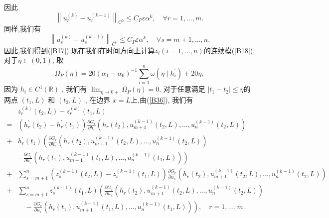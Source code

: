 \documentclass[notitlepage,cs4size,punct,oneside]{ctexrep}
\numberwithin{equation}{chapter}
\theoremstyle{mystyle}
\begin{document}
因此
\begin{equation} \label{B59}
    \left\|u_{r}^{(k)}-u_{r}^{(k-1)}\right\|_{C^{0}} \leq C_{P} \varepsilon \alpha^{k}, \quad \forall r=1, \ldots, m .
\end{equation}
同样,我们有
\begin{equation} \label{B60}
    \left\|u_{s}^{(k)}-u_{s}^{(k-1)}\right\|_{C^{0}} \leq C_{P} \varepsilon \alpha^{k}, \quad \forall s=m+1, \ldots, n .
\end{equation}
因此,我们得到(\ref{B17}).现在我们在时间方向上计算$z_{i}(i=1, \ldots, n)$的连续模(\ref{B18}),对于$\eta \in(0,1)$, 取
\begin{equation} \label{B61}
    \Omega_{P}(\eta)=20\left(\alpha_{1}-\alpha_{0}\right)^{-1} \sum_{i=1}^{n} \omega\left(\eta \mid h_{i}^{\prime}\right)+20 \eta,
\end{equation}
因为 $h_{i} \in C^{1}(\mathbb{R})$ , 我们有 $\lim_{\eta \rightarrow 0+} \Omega_{P}(\eta)=0$.
对于任意满足 $\left|t_{1}-t_{2}\right| \leq \eta$的两点 $\left(t_{1}, L\right)$ 和 $\left(t_{2}, L\right)$ , 在边界 $x=L$上,由(\ref{B36}), 我们有
\begin{align}
      & z_{r}^{(k)}\left(t_{2}, L\right)-z_{r}^{(k)}\left(t_{1}, L\right)\nonumber                                                                                                                                                                                              \\
    = & \left(h_{r}^{\prime}\left(t_{2}\right)-h_{r}^{\prime}\left(t_{1}\right)\right) \frac{\partial G_{r}}{\partial h_{r}}\left(h_{r}\left(t_{2}\right), u_{m+1}^{(k-1)}\left(t_{2}, L\right), \ldots, u_{n}^{(k-1)}\left(t_{2}, L\right)\right)\nonumber                     \\
    + & h_{r}^{\prime}\left(t_{1}\right)\left(\frac{\partial G_{r}}{\partial h_{r}}\left(h_{r}\left(t_{2}\right), u_{m+1}^{(k-1)}\left(t_{2}, L\right), \ldots, u_{n}^{(k-1)}\left(t_{2}, L\right)\right)\right.\nonumber                                                       \\
      & \left.-\frac{\partial G_{r}}{\partial h_{r}}\left(h_{r}\left(t_{1}\right), u_{m+1}^{(k-1)}\left(t_{1}, L\right), \ldots, u_{n}^{(k-1)}\left(t_{1}, L\right)\right)\right)\nonumber                                                                                      \\
    + & \sum_{s=m+1}^{n}\left(z_{s}^{(k-1)}\left(t_{2}, L\right)-z_{s}^{(k-1)}\left(t_{1}, L\right)\right) \frac{\partial G_{r}}{\partial u_{s}}\left(h_{r}\left(t_{2}\right), u_{m+1}^{(k-1)}\left(t_{2}, L\right), \ldots, u_{n}^{(k-1)}\left(t_{2}, L\right)\right)\nonumber \\
    + & \sum_{s=m+1}^{n} z_{s}^{(k-1)}\left(t_{1}, L\right)\left(\frac{\partial G_{r}}{\partial u_{s}}\left(h_{r}\left(t_{2}\right), u_{m+1}^{(k-1)}\left(t_{2}, L\right), \ldots, u_{n}^{(k-1)}\left(t_{2}, L\right)\right)\right.\nonumber                                    \\
      & \left.\quad-\frac{\partial G_{r}}{\partial u_{s}}\left(h_{r}\left(t_{1}\right), u_{m+1}^{(k-1)}\left(t_{1}, L\right), \ldots, u_{n}^{(k-1)}\left(t_{1}, L\right)\right)\right), \quad r=1, \ldots, m .\label{B62}
\end{align}
\end{document}
